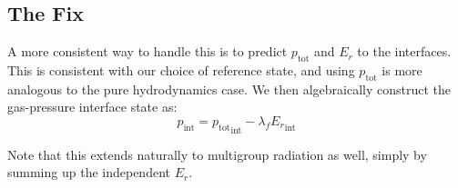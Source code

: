 \documentclass[12pt]{article}
\begin{document}
\subsection*{The Fix}

A more consistent way to handle this is to predict $p_\mathrm{tot}$
and $E_r$ to the interfaces.  This is consistent with our choice of
reference state, and using $p_\mathrm{tot}$ is more analogous to the
pure hydrodynamics case.  We then algebraically construct the
gas-pressure interface state as:
\begin{equation}
p_\mathrm{int} = {p_\mathrm{tot}}_\mathrm{int} - \lambda_f {E_r}_\mathrm{int}
\end{equation}

Note that this extends naturally to multigroup radiation as well, simply by
summing up the independent $E_r$.
\end{document}

